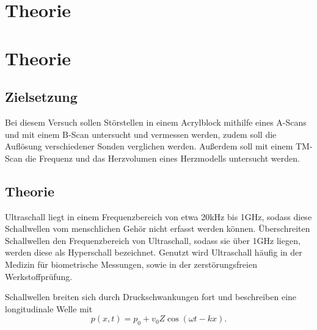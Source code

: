 \section{Theorie}
\section{Theorie}
\label{sec:Theorie}


\subsection{Zielsetzung}
Bei diesem Versuch sollen Störstellen in einem Acrylblock mithilfe eines A-Scans und
mit einem B-Scan untersucht und vermessen werden, zudem soll die Auflösung verschiedener
Sonden verglichen werden.
Außerdem soll mit einem TM-Scan die Frequenz und das Herzvolumen eines Herzmodells untersucht werden.


\subsection{Theorie}
Ultraschall liegt in einem Frequenzbereich von etwa 20\;kHz bis 1\;GHz, sodass diese
Schallwellen vom menschlichen Gehör nicht erfasst werden können. Überschreiten Schallwellen den
Frequenzbereich von Ultraschall, sodass sie über 1\;GHz liegen, werden diese als Hyperschall bezeichnet.
Genutzt wird Ultraschall häufig in der Medizin für biometrische Messungen, sowie in
der zerstörungsfreien Werkstoffprüfung.

Schallwellen breiten sich durch Druckschwankungen fort und beschreiben eine
longitudinale Welle mit
\begin{equation}
  p(x,t)= p_0 +v_0 Z\cos{(\omega t - k x)}.
  \label{longitud}
\end{equation}

